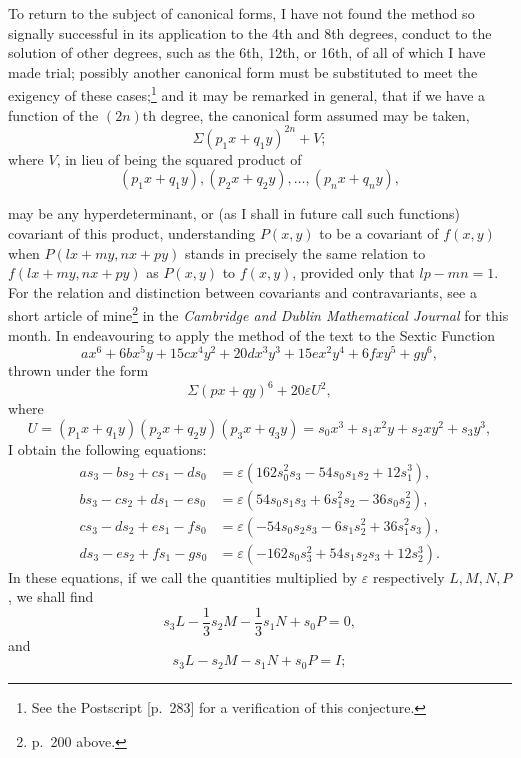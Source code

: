 \documentclass[11pt]{article}
\newcommand{\sourcepage}[1]{\marginpar{\scriptsize p.~#1}}
\begin{document}
{{To return to the subject of canonical forms, I have not found the method so signally successful in its application to the 4th and 8th degrees, conduct to the solution of other degrees, such as the 6th, 12th, or 16th, of all of which I have made trial; possibly another canonical form must be substituted to meet the exigency of these cases;\footnote{See the Postscript [p.~283] for a verification of this conjecture.} and it may be remarked in general, that if we have a function of the $(2n)$th degree, the canonical form assumed may be taken,
\[
\Sigma(p_1x+q_1y)^{2n}+V;
\]
where $V$, in lieu of being the squared product of
\[
(p_1x+q_1y),(p_2x+q_2y),\ldots,(p_nx+q_ny),
\]

\sourcepage{280}
may be any hyperdeterminant, or (as I shall in future call such functions) covariant of this product, understanding $P(x,y)$ to be a covariant of $f(x,y)$ when $P(lx+my,nx+py)$ stands in precisely the same relation to $f(lx+my,nx+py)$ as $P(x,y)$ to $f(x,y)$, provided only that $lp-mn=1$. For the relation and distinction between covariants and contravariants, see a short article of mine\footnote{p.~200 above.} in the \emph{Cambridge and Dublin Mathematical Journal} for this month. In endeavouring to apply the method of the text to the Sextic Function
\[
ax^6+6bx^5y+15cx^4y^2+20dx^3y^3+15ex^2y^4+6fxy^5+gy^6,
\]
thrown under the form
\[
\Sigma(px+qy)^6+20\varepsilon U^2,
\]
where
\[
U=(p_1x+q_1y)(p_2x+q_2y)(p_3x+q_3y)
=s_0x^3+s_1x^2y+s_2xy^2+s_3y^3,
\]
I obtain the following equations:
\[
\begin{aligned}
as_3-bs_2+cs_1-ds_0&=\varepsilon(162s_0^2s_3-54s_0s_1s_2+12s_1^3),\\
bs_3-cs_2+ds_1-es_0&=\varepsilon(54s_0s_1s_3+6s_1^2s_2-36s_0s_2^2),\\
cs_3-ds_2+es_1-fs_0&=\varepsilon(-54s_0s_2s_3-6s_1s_2^2+36s_1^2s_3),\\
ds_3-es_2+fs_1-gs_0&=\varepsilon(-162s_0s_3^2+54s_1s_2s_3+12s_2^3).
\end{aligned}
\]
In these equations, if we call the quantities multiplied by $\varepsilon$ respectively $L,M,N,P$, we shall find
\[
s_3L-\frac13s_2M-\frac13s_1N+s_0P=0,
\]
and
\[
s_3L-s_2M-s_1N+s_0P=I;
\]
}}
\end{document}
